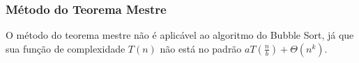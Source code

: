 \subsubsection{Método do Teorema Mestre}
O método do teorema mestre não é aplicável ao algoritmo do Bubble Sort, já que sua função de complexidade $T(n)$ não está no padrão $aT(\frac{n}{b}) + \Theta(n^k)$.
